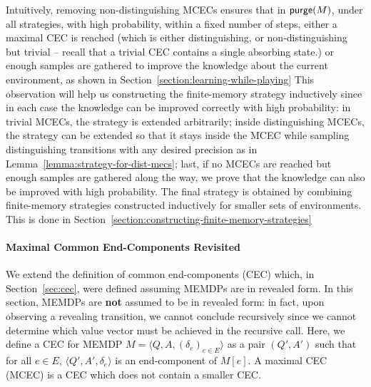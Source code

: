 \documentclass[a4paper,USenglish,cleveref, autoref, thm-restate]{lipics-v2021}
\newcommand{\tuple}[1]{\langle #1 \rangle}
\newcommand\purge[1]{\textrm{\sf purge}(#1)}
\begin{document}
Intuitively, removing non-distinguishing MCECs ensures that in $\purge{M}$, under all strategies, with high probability, within a fixed number of steps,
either a maximal CEC is reached (which is either distinguishing, or non-distinguishing but trivial  -- recall that a trivial CEC contains a single absorbing state.)
or enough samples are gathered to improve the knowledge about the current environment, as shown in Section~\ref{section:learning-while-playing}
This observation will help us constructing the finite-memory strategy inductively since in each case the knowledge can be improved correctly with high probability:
in trivial MCECs, the strategy is extended arbitrarily; inside distinguishing MCECs, the strategy can be extended so that it stays inside the MCEC while sampling distinguishing transitions with any desired precision as in Lemma~\ref{lemma:strategy-for-dist-mecs};
last, if no MCECs are reached but enough samples are gathered along the way, we prove that the knowledge can also be improved with high probability. 
The final strategy is obtained by combining finite-memory strategies constructed inductively for smaller sets of environments. 
This is done in Section~\ref{section:constructing-finite-memory-strategies}

\paragraph*{Maximal Common End-Components Revisited}
We extend 
the definition of common end-components (CEC) which, in Section~\ref{sec:cec}, were defined assuming MEMDPs are in revealed form. In this section, MEMDPs are \textbf{not} assumed to be in revealed form: in fact, upon observing a revealing transition, we cannot conclude recursively since we cannot determine which value vector must be achieved in the recursive call.
Here, we define a CEC for MEMDP $M=\tuple{Q,A,(\delta_e)_{e\in E}}$ as a pair $(Q',A')$ such that for all $e\in E$, 
$\tuple{Q',A',\delta_e}$ is an end-component of $M[e]$.
A maximal CEC (MCEC) is a CEC which does not contain a smaller CEC.
\end{document}
